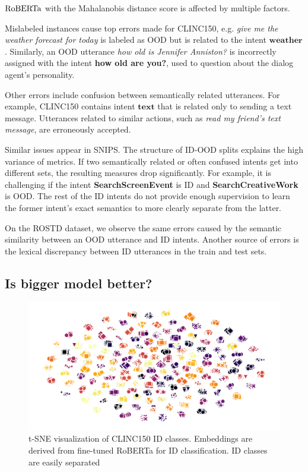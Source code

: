 \documentclass[letterpaper, final]{article} %
\begin{document}
$\rm{RoBERTa}$ with the Mahalanobis distance score is affected by multiple factors.

Mislabeled instances cause top errors made for CLINC150, e.g. {\it give me the weather forecast for today} is labeled as OOD but is related to the intent $\mathbf{weather}$. Similarly, an OOD utterance {\it how old is Jennifer Anniston?}  is incorrectly assigned with the intent {\bf how old are you?}, used to question about the dialog agent's personality.


Other errors include confusion between semantically related utterances.  For example, CLINC150 contains intent $\mathbf{text}$ that is related only to sending a text message. Utterances related to similar actions, such as {\it read my friend's text message}, are erroneously accepted.


Similar issues appear in SNIPS. The structure of ID-OOD  splits explains the high variance of metrics. If two semantically related or often confused intents get into different sets, the resulting measures drop significantly. For example, it is  challenging  if the intent {\bf SearchScreenEvent} is ID and {\bf SearchCreativeWork} is OOD. The rest of the ID intents do not provide enough supervision to learn the former intent's exact semantics to more clearly separate from the latter.

On the ROSTD dataset, we observe the same errors caused by the semantic similarity between an OOD utterance and ID intents. Another source of errors is the lexical discrepancy between ID utterances in the train and test sets.



\subsection{Is bigger model better?}

%
\begin{figure}[t]
  \includegraphics[width=\columnwidth]{roberta_train_features_tsne.png}
  \caption{t-SNE visualization of CLINC150 ID classes. Embeddings are derived from fine-tuned RoBERTa for ID classification. ID classes are easily separated}
  \label{fig:tsne}
\end{figure}
\end{document}
